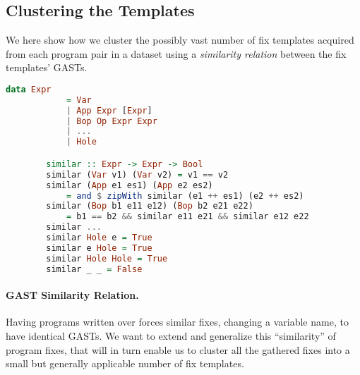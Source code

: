 

\subsection{Clustering the Templates}
We here show how we cluster the possibly vast number of fix templates acquired
from each program pair in a dataset using a \emph{similarity relation} between
the fix templates' GASTs.
\label{subsec:clustering}
\begin{figure*}
    \begin{minipage}{\textwidth}
        \begin{lstlisting}[language=haskell, frame=single]
        data Expr
            = Var
            | App Expr [Expr]
            | Bop Op Expr Expr
            | ...
            | Hole

        similar :: Expr -> Expr -> Bool
        similar (Var v1) (Var v2) = v1 == v2
        similar (App e1 es1) (App e2 es2)
            = and $ zipWith similar (e1 ++ es1) (e2 ++ es2)
        similar (Bop b1 e11 e12) (Bop b2 e21 e22)
            = b1 == b2 && similar e11 e21 && similar e12 e22
        similar ...
        similar Hole e = True
        similar e Hole = True
        similar Hole Hole = True
        similar _ _ = False

        \end{lstlisting}
    \end{minipage}
    \caption{}
    \label{fig:haskell}
\end{figure*}

\paragraph{GAST Similarity Relation.}
Having programs written over \repairLang forces similar fixes, \ie changing a
variable name, to have identical GASTs. We want to extend and generalize this
``similarity'' of program fixes, that will in turn enable us to cluster all the
gathered fixes into a small but generally applicable number of fix templates.

